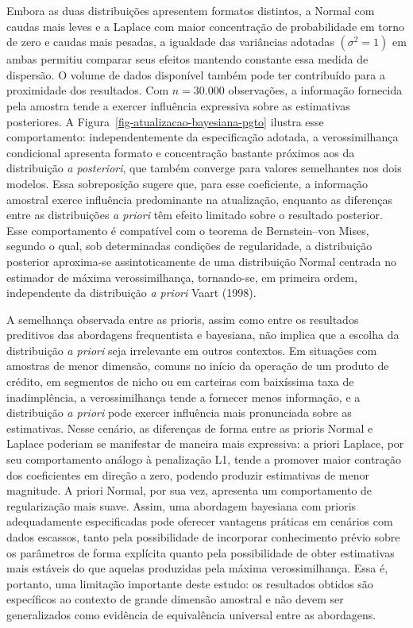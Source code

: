 \documentclass[
  brazilian,
  12pt,
  letterpaper,
  DIV=11,
  numbers=noendperiod]{scrartcl}
\begin{document}
Embora as duas distribuições apresentem formatos distintos, a Normal com
caudas mais leves e a Laplace com maior concentração de probabilidade em
torno de zero e caudas mais pesadas, a igualdade das variâncias adotadas
\((\sigma^2=1)\) em ambas permitiu comparar seus efeitos mantendo
constante essa medida de dispersão. O volume de dados disponível também
pode ter contribuído para a proximidade dos resultados. Com \(n=30.000\)
observações, a informação fornecida pela amostra tende a exercer
influência expressiva sobre as estimativas posteriores. A
Figura~\ref{fig-atualizacao-bayesiana-pgto} ilustra esse comportamento:
independentemente da especificação adotada, a verossimilhança
condicional apresenta formato e concentração bastante próximos aos da
distribuição \emph{a posteriori}, que também converge para valores
semelhantes nos dois modelos. Essa sobreposição sugere que, para esse
coeficiente, a informação amostral exerce influência predominante na
atualização, enquanto as diferenças entre as distribuições \emph{a
priori} têm efeito limitado sobre o resultado posterior. Esse
comportamento é compatível com o teorema de Bernstein--von Mises,
segundo o qual, sob determinadas condições de regularidade, a
distribuição posterior aproxima-se assintoticamente de uma distribuição
Normal centrada no estimador de máxima verossimilhança, tornando-se, em
primeira ordem, independente da distribuição \emph{a priori} Vaart
(1998).

A semelhança observada entre as prioris, assim como entre os resultados
preditivos das abordagens frequentista e bayesiana, não implica que a
escolha da distribuição \emph{a priori} seja irrelevante em outros
contextos. Em situações com amostras de menor dimensão, comuns no início
da operação de um produto de crédito, em segmentos de nicho ou em
carteiras com baixíssima taxa de inadimplência, a verossimilhança tende
a fornecer menos informação, e a distribuição \emph{a priori} pode
exercer influência mais pronunciada sobre as estimativas. Nesse cenário,
as diferenças de forma entre as prioris Normal e Laplace poderiam se
manifestar de maneira mais expressiva: a priori Laplace, por seu
comportamento análogo à penalização L1, tende a promover maior contração
dos coeficientes em direção a zero, podendo produzir estimativas de
menor magnitude. A priori Normal, por sua vez, apresenta um
comportamento de regularização mais suave. Assim, uma abordagem
bayesiana com prioris adequadamente especificadas pode oferecer
vantagens práticas em cenários com dados escassos, tanto pela
possibilidade de incorporar conhecimento prévio sobre os parâmetros de
forma explícita quanto pela possibilidade de obter estimativas mais
estáveis do que aquelas produzidas pela máxima verossimilhança. Essa é,
portanto, uma limitação importante deste estudo: os resultados obtidos
são específicos ao contexto de grande dimensão amostral e não devem ser
generalizados como evidência de equivalência universal entre as
abordagens.
\end{document}
